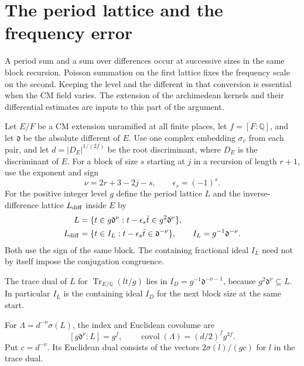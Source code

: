 \section{The period lattice and the frequency error}\label{sec:period-lattice}
\hypertarget{source-lattice-estimates}{}

A period sum and a sum over differences occur at successive sizes in the same block recursion. Poisson summation on the first lattice fixes the frequency scale on the second. Keeping the level and the different in that conversion is essential when the CM field varies. The extension of the
archimedean kernels and their differential estimates are inputs
to this part of the argument. \label{cor:lattice-estimates-1}

Let \(E/F\) be a CM extension unramified at all finite places,
let \(f=[F:\mathbb Q]\), and let \(\mathfrak d\) be the absolute
different of \(E\). Use one complex embedding \(\sigma_v\) from each
pair, and let \(d=|D_E|^{1/(2f)}\) be the root discriminant, where \(D_E\) is the discriminant of \(E\). For a block of size \(s\) starting
at \(j\) in a recursion of length \(r+1\), use the exponent and sign
\[
 \nu=2r+3-2j-s,\qquad\epsilon_s=(-1)^s.
\]
For the positive integer level \(g\) define the period lattice
\(L\) and the inverse-difference lattice \(L_{\rm diff}\) inside \(E\) by
\begin{equation}\label{eq:period-and-difference-lattices}
 \begin{aligned}
 L&=\{t\in g\mathfrak d^\nu:t-\epsilon_s\bar t\in g^2\mathfrak d^\nu\},\\
 L_{\rm diff}&=\{t\in I_L:t-\epsilon_s\bar t\in\mathfrak d^{-\nu}\},
      \qquad I_L=g^{-1}\mathfrak d^{-\nu}.
 \end{aligned}
\end{equation}
Both use the sign of the same block. The containing fractional ideal
\(I_L\) need not by itself impose the conjugation congruence.
\begin{lemma}\label{lem:period-lattice-normalization}
The trace dual of \(L\) for \(\operatorname{Tr}_{E/\mathbb Q}(lt/g)\)
lies in \(I_D=g^{-1}\mathfrak d^{-\nu-1}\), because
\(g^2\mathfrak d^\nu\subseteq L\). In particular \(I_L\) is the
containing ideal \(I_D\) for the next block size at the same start.

For \(\Lambda=d^{-\nu}\sigma(L)\), the index and Euclidean covolume are
\[
 [g\mathfrak d^\nu:L]=g^f,\qquad \operatorname{covol}(\Lambda)=(d/2)^f g^{3f}.
\]
 Put
\(c=d^{-\nu}\). Its Euclidean dual consists of the vectors
\(2\overline{\sigma(l)}/(gc)\) for \(l\) in the trace dual.
\end{lemma}


